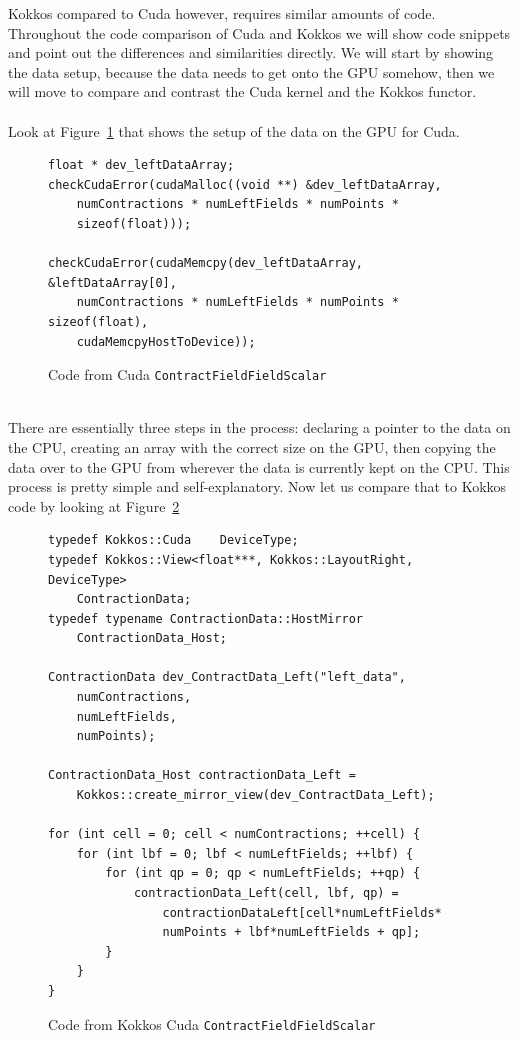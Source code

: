 Kokkos compared to Cuda however, requires similar amounts of code. 
Throughout the code comparison of Cuda and Kokkos we will show
code snippets and point out the differences and similarities directly. We will
start by showing the data setup, because the data needs to get onto the GPU
somehow, then we will move to compare and contrast the Cuda kernel and the Kokkos
functor. \\
\\
Look at Figure~\ref{lst:ContractFieldFieldScalar Cuda Data Setup} that shows the setup of the data on the GPU for Cuda. \\
\begin{figure}[!htb]
	\begin{lstlisting}
float * dev_leftDataArray;
checkCudaError(cudaMalloc((void **) &dev_leftDataArray, 
	numContractions * numLeftFields * numPoints * 
	sizeof(float)));
	
checkCudaError(cudaMemcpy(dev_leftDataArray, &leftDataArray[0], 
	numContractions * numLeftFields * numPoints * sizeof(float), 
	cudaMemcpyHostToDevice));
	\end{lstlisting}
\caption{Code from Cuda \texttt{ContractFieldFieldScalar}
\label{lst:ContractFieldFieldScalar Cuda Data Setup}}
\end{figure}
\\
There are essentially three steps in the process: declaring a pointer to the
data on the CPU, creating an array with the correct size on the GPU, then
copying the data over to the GPU from wherever the data is currently kept on the
CPU. This process is pretty simple and self-explanatory. Now let us compare that
to Kokkos code by looking at Figure~\ref{lst:ContractFieldFieldScalar Kokkos Cuda Data Setup} \\
\begin{figure}[!htb]
	\begin{lstlisting}
typedef Kokkos::Cuda	DeviceType;
typedef Kokkos::View<float***, Kokkos::LayoutRight, DeviceType>
	ContractionData;
typedef typename ContractionData::HostMirror
	ContractionData_Host;

ContractionData dev_ContractData_Left("left_data",
	numContractions,
	numLeftFields,
	numPoints);

ContractionData_Host contractionData_Left = 
	Kokkos::create_mirror_view(dev_ContractData_Left);

for (int cell = 0; cell < numContractions; ++cell) {
	for (int lbf = 0; lbf < numLeftFields; ++lbf) {
		for (int qp = 0; qp < numLeftFields; ++qp) {
			contractionData_Left(cell, lbf, qp) = 
				contractionDataLeft[cell*numLeftFields*
				numPoints + lbf*numLeftFields + qp];
		}
	}
}
	\end{lstlisting}
\caption{Code from Kokkos Cuda \texttt{ContractFieldFieldScalar}
\label{lst:ContractFieldFieldScalar Kokkos Cuda Data Setup}}
\end{figure}
